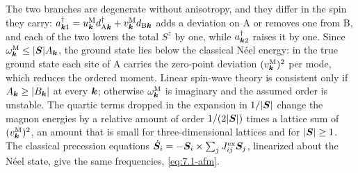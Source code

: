 The two branches are degenerate without anisotropy, and they differ in the spin they carry: $a^\dagger_{\bm{k}1} = u^{\mathrm{M}}_{\bm{k}}d^\dagger_{\mathrm{A}\bm{k}} + v^{\mathrm{M}}_{\bm{k}}d_{\mathrm{B}\bm{k}}$ adds a deviation on A or removes one from B, and each of the two lowers the total $S^z$ by one, while $a^\dagger_{\bm{k}2}$ raises it by one. Since $\omega^{\mathrm{M}}_{\bm{k}} \le |\bm{S}|A_{\bm{k}}$, the ground state lies below the classical Néel energy: in the true ground state each site of A carries the zero-point deviation $(v^{\mathrm{M}}_{\bm{k}})^2$ per mode, which reduces the ordered moment. Linear spin-wave theory is consistent only if $A_{\bm{k}} \ge |B_{\bm{k}}|$ at every $\bm{k}$; otherwise $\omega^{\mathrm{M}}_{\bm{k}}$ is imaginary and the assumed order is unstable. The quartic terms dropped in the expansion in $1/|\bm{S}|$ change the magnon energies by a relative amount of order $1/(2|\bm{S}|)$ times a lattice sum of $(v^{\mathrm{M}}_{\bm{k}})^2$, an amount that is small for three-dimensional lattices and for $|\bm{S}| \ge 1$. The classical precession equations $\dot{\bm{S}}_i = -\bm{S}_i\times\sum_jJ^{\mathrm{ex}}_{ij}\bm{S}_j$, linearized about the Néel state, give the same frequencies, \cref{eq:7.1-afm}.

